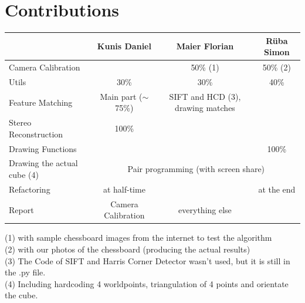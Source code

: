 \documentclass[paper=a4, fontsize=11pt]{scrartcl}
\numberwithin{equation}{section}		%
\numberwithin{figure}{section}			%
\numberwithin{table}{section}				%
\begin{document}
\section*{Contributions}
\begin{table}[!htbp]
\begin{tabular}{|l|ccc|}
\hline
{\color[HTML]{656565} }                        & {\color[HTML]{9B9B9B} Kunis Daniel}         & {\color[HTML]{9B9B9B} Maier Florian}                   & {\color[HTML]{9B9B9B} Rüba Simon} \\ \hline
{\color[HTML]{9B9B9B} Camera Calibration}      & \multicolumn{1}{c|}{}                       & \multicolumn{1}{c|}{50\% (1)}                          & 50\% (2)                          \\ \cline{2-4} 
{\color[HTML]{9B9B9B} Utils}                   & \multicolumn{1}{c|}{30\%}                   & \multicolumn{1}{c|}{30\%}                              & 40\%                              \\ \cline{2-4} 
{\color[HTML]{9B9B9B} Feature Matching}        & \multicolumn{1}{c|}{Main part ($\sim$75\%)} & \multicolumn{1}{c|}{SIFT and HCD (3), drawing matches} &                                   \\ \cline{2-4} 
{\color[HTML]{9B9B9B} Stereo Reconstruction}   & \multicolumn{1}{c|}{100\%}                  & \multicolumn{1}{c|}{}                                  &                                   \\ \cline{2-4} 
{\color[HTML]{9B9B9B} Drawing Functions}       & \multicolumn{1}{c|}{}                       & \multicolumn{1}{c|}{}                                  & 100\%                             \\ \cline{2-4} 
{\color[HTML]{9B9B9B} Drawing the actual cube (4)} & \multicolumn{3}{c|}{Pair programming (with screen share)}                                                                                \\ \cline{2-4} 
{\color[HTML]{9B9B9B} Refactoring}             & \multicolumn{1}{c|}{at half-time}           & \multicolumn{1}{c|}{}                                  & at the end                        \\ \cline{2-4} 
{\color[HTML]{9B9B9B} Report}                  & \multicolumn{1}{c|}{Camera Calibration}     & \multicolumn{1}{c|}{everything else}                   &                                   \\ \hline
\end{tabular}
\end{table}\smallskip\noindent(1) with sample chessboard images from the internet to test the algorithm\\(2) with our photos of the chessboard (producing the actual results)\\(3) The Code of SIFT and Harris Corner Detector wasn't used, but it is still in the .py file.\\(4) Including hardcoding 4 worldpoints, triangulation of 4 points and orientate the cube.


\end{document}
